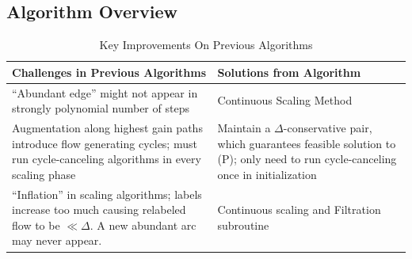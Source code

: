 \documentclass[11pt]{article}
\theoremstyle{definition}
\theoremstyle{definition}
\begin{document}
\subsection{Algorithm Overview} 
\begin{table}[H]
\begin{center}
    \begin{tabular}{ | p{7cm} | p{7cm} |}
    \hline
    Challenges in Previous Algorithms  & Solutions from Algorithm \\ \hline
    ``Abundant edge'' might not appear in strongly polynomial number of steps \cite{Radzik2004} & Continuous Scaling Method  \\ \hline
    Augmentation along highest gain paths introduce flow generating cycles; must run cycle-canceling algorithms in every scaling phase \cite{Goldberg:1991:CAG:105014.105022} & Maintain a $\Delta$-conservative pair, which guarantees feasible solution to (P); only need to run cycle-canceling once in initialization  \\ \hline
    ``Inflation'' in scaling algorithms; labels increase too much causing relabeled flow to be $\ll \Delta$. A new abundant arc may never appear. & Continuous scaling and Filtration subroutine \\
    \hline
    \end{tabular}
\end{center}
\caption{Key Improvements On Previous Algorithms}
\label{tab:improvementsInitial}
\end{table}
\end{document}
